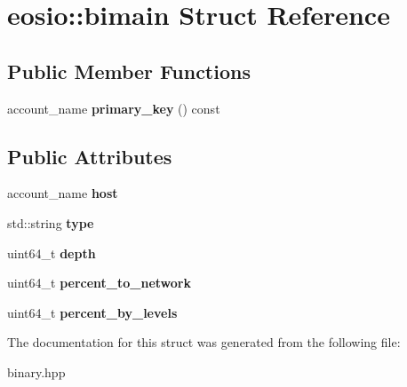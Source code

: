 \hypertarget{structeosio_1_1bimain}{}\section{eosio\+:\+:bimain Struct Reference}
\label{structeosio_1_1bimain}
\subsection*{Public Member Functions}
\begin{DoxyCompactItemize}
\item 
\mbox{\label{structeosio_1_1bimain_a89d1d29713e5a0055449533445e7cef2}} 
account\+\_\+name {\bfseries primary\+\_\+key} () const
\end{DoxyCompactItemize}
\subsection*{Public Attributes}
\begin{DoxyCompactItemize}
\item 
\mbox{\label{structeosio_1_1bimain_a6d2151e2cde25146afbe026e4ab9c245}} 
account\+\_\+name {\bfseries host}
\item 
\mbox{\label{structeosio_1_1bimain_a144e177a22d64057ba673a51c3eb8d3f}} 
std\+::string {\bfseries type}
\item 
\mbox{\label{structeosio_1_1bimain_a081dab55fcd93e5f8bfaa5de86ebbb72}} 
uint64\+\_\+t {\bfseries depth}
\item 
\mbox{\label{structeosio_1_1bimain_adaef10af8a54c27df411f66e8a14b0ea}} 
uint64\+\_\+t {\bfseries percent\+\_\+to\+\_\+network}
\item 
\mbox{\label{structeosio_1_1bimain_a8e8a04ce1a8cb75bb450873edef0c03f}} 
uint64\+\_\+t {\bfseries percent\+\_\+by\+\_\+levels}
\end{DoxyCompactItemize}


The documentation for this struct was generated from the following file\+:\begin{DoxyCompactItemize}
\item 
binary.\+hpp\end{DoxyCompactItemize}
